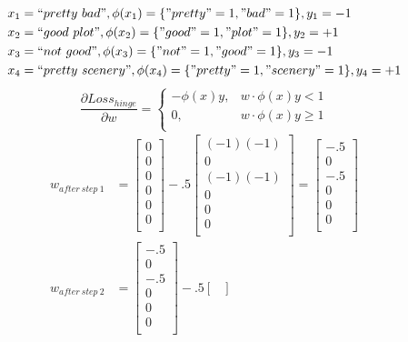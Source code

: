\documentclass[10pt]{article}
\begin{document}
\begin{enumerate}[label=(\alph*)]
  \begin{align*}
  x_1 &= ``pretty\ bad", \phi(x_1) = \{ "pretty" = 1, "bad" = 1 \}, y_1 = -1\\
  x_2 &=``good\ plot", \phi(x_2) = \{ "good" = 1, "plot" = 1 \}, y_2 = +1\\
  x_3 &=``not\ good", \phi(x_3) = \{ "not" = 1, "good" = 1 \}, y_3 = -1\\
  x_4 &= ``pretty\ scenery", \phi(x_4) = \{ "pretty" = 1, "scenery" = 1 \}, y_4 = +1\\
  \end{align*}
  $$
  \frac{\partial Loss_{hinge}}{\partial w} = \begin{cases}
  -\phi(x)y, &w \cdot \phi(x)y < 1\\
  0, &w \cdot \phi(x)y \geq 1\\
  \end{cases}
  $$
  \begin{align*}
  w_{after\ step\ 1} &= \begin{bmatrix}
  0\\
  0\\
  0\\
  0\\
  0\\
  0\\
  \end{bmatrix} - .5 \begin{bmatrix}
  (-1)(-1)\\
  0\\
  (-1)(-1)\\
  0\\
  0\\
  0\\
  \end{bmatrix} = \begin{bmatrix}
  -.5\\
  0\\
  -.5\\
  0\\
  0\\
  0\\
  \end{bmatrix}\\  
  w_{after\ step\ 2} &= \begin{bmatrix}
  -.5\\
  0\\
  -.5\\
  0\\
  0\\
  0\\
  \end{bmatrix} - .5 \begin{bmatrix}

\end{bmatrix}
\end{align*}
\end{enumerate}
\end{document}
